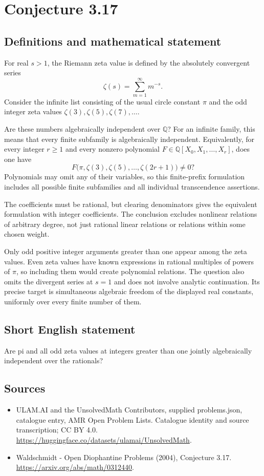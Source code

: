\documentclass[11pt,a4paper]{article}
\begin{document}
\section*{Conjecture 3.17}\label{statement}

\subsection{Definitions and mathematical statement}
For real $s>1$, the Riemann zeta value is defined by the absolutely convergent series
\[
\zeta(s)=\sum_{m=1}^{\infty}m^{-s}.
\]
Consider the infinite list consisting of the usual circle constant $\pi$ and the odd integer zeta values $\zeta(3),\zeta(5),\zeta(7),\ldots$.

Are these numbers algebraically independent over $\mathbb Q$? For an infinite family, this means that every finite subfamily is algebraically independent. Equivalently, for every integer $r\ge1$ and every nonzero polynomial $F\in\mathbb Q[X_0,X_1,\ldots,X_r]$, does one have
\[
F\bigl(\pi,\zeta(3),\zeta(5),\ldots,\zeta(2r+1)\bigr)\ne0?
\]
Polynomials may omit any of their variables, so this finite-prefix formulation includes all possible finite subfamilies and all individual transcendence assertions.

The coefficients must be rational, but clearing denominators gives the equivalent formulation with integer coefficients. The conclusion excludes nonlinear relations of arbitrary degree, not just rational linear relations or relations within some chosen weight.

Only odd positive integer arguments greater than one appear among the zeta values. Even zeta values have known expressions in rational multiples of powers of $\pi$, so including them would create polynomial relations. The question also omits the divergent series at $s=1$ and does not involve analytic continuation. Its precise target is simultaneous algebraic freedom of the displayed real constants, uniformly over every finite number of them.
\subsection{Short English statement}
Are pi and all odd zeta values at integers greater than one jointly algebraically independent over the rationals?
\subsection{Sources}
\begin{itemize}
\item[S1] ULAM.AI and the UnsolvedMath Contributors, supplied problems.json, catalogue entry, AMR Open Problem Lists. Catalogue identity and source transcription; CC BY 4.0.
\url{https://huggingface.co/datasets/ulamai/UnsolvedMath}.
\item[S2] Waldschmidt - Open Diophantine Problems (2004), Conjecture 3.17. 
\url{https://arxiv.org/abs/math/0312440}.
\end{itemize}
\end{document}
